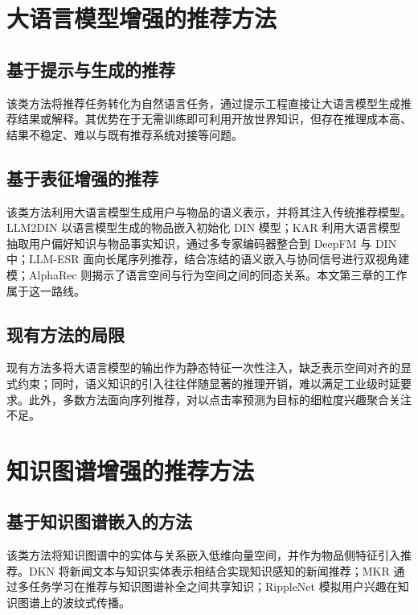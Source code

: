 \section{大语言模型增强的推荐方法}
\label{sec:llm4rec}

\subsection{基于提示与生成的推荐}
\label{subsec:llm-prompt}

该类方法将推荐任务转化为自然语言任务，通过提示工程直接让大语言模型生成推荐结果或解释\cite{zhao2024llmrec}。其优势在于无需训练即可利用开放世界知识，但存在推理成本高、结果不稳定、难以与既有推荐系统对接等问题。

\subsection{基于表征增强的推荐}
\label{subsec:llm-representation}

该类方法利用大语言模型生成用户与物品的语义表示，并将其注入传统推荐模型。LLM2DIN 以语言模型生成的物品嵌入初始化 DIN 模型\cite{harte2023llm2din}；KAR 利用大语言模型抽取用户偏好知识与物品事实知识，通过多专家编码器整合到 DeepFM 与 DIN 中\cite{xi2024kar}；LLM-ESR 面向长尾序列推荐，结合冻结的语义嵌入与协同信号进行双视角建模\cite{liu2024llmesr}；AlphaRec 则揭示了语言空间与行为空间之间的同态关系\cite{sheng2024alpharec}。本文第三章的工作属于这一路线。

\subsection{现有方法的局限}
\label{subsec:llm-limitation}

现有方法多将大语言模型的输出作为静态特征一次性注入，缺乏表示空间对齐的显式约束；同时，语义知识的引入往往伴随显著的推理开销，难以满足工业级时延要求。此外，多数方法面向序列推荐，对以点击率预测为目标的细粒度兴趣聚合关注不足。

\section{知识图谱增强的推荐方法}
\label{sec:kg4rec}

\subsection{基于知识图谱嵌入的方法}
\label{subsec:kg-embedding}

该类方法将知识图谱中的实体与关系嵌入低维向量空间，并作为物品侧特征引入推荐。DKN 将新闻文本与知识实体表示相结合实现知识感知的新闻推荐\cite{wang2018dkn}；MKR 通过多任务学习在推荐与知识图谱补全之间共享知识\cite{wang2019mkr}；RippleNet 模拟用户兴趣在知识图谱上的波纹式传播\cite{wang2018ripplenet}。

